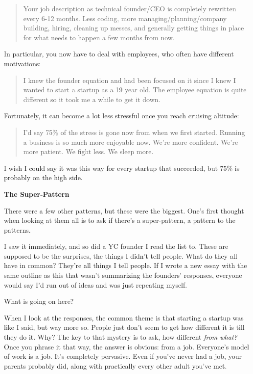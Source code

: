 \documentclass[12pt]{book}
\begin{document}
\begin{quote}
Your job description as technical founder/CEO is completely rewritten
every 6-12 months. Less coding, more managing/planning/company building,
hiring, cleaning up messes, and generally getting things in place for
what needs to happen a few months from now.
\end{quote}

In particular, you now have to deal with employees, who often have
different motivations:

\begin{quote}
I knew the founder equation and had been focused on it since I knew I
wanted to start a startup as a 19 year old. The employee equation is
quite different so it took me a while to get it down.
\end{quote}

Fortunately, it can become a lot less stressful once you reach cruising
altitude:

\begin{quote}
I'd say 75\% of the stress is gone now from when we first started.
Running a business is so much more enjoyable now. We're more confident.
We're more patient. We fight less. We sleep more.
\end{quote}

I wish I could say it was this way for every startup that succeeded, but
75\% is probably on the high side.

\textbf{The Super-Pattern}

There were a few other patterns, but these were the biggest. One's first
thought when looking at them all is to ask if there's a super-pattern, a
pattern to the patterns.

I saw it immediately, and so did a YC founder I read the list to. These
are supposed to be the surprises, the things I didn't tell people. What
do they all have in common? They're all things I tell people. If I wrote
a new essay with the same outline as this that wasn't summarizing the
founders' responses, everyone would say I'd run out of ideas and was
just repeating myself.

What is going on here?

When I look at the responses, the common theme is that starting a
startup was like I said, but way more so. People just don't seem to get
how different it is till they do it. Why? The key to that mystery is to
ask, how different \emph{from what?} Once you phrase it that way, the
answer is obvious: from a job. Everyone's model of work is a job. It's
completely pervasive. Even if you've never had a job, your parents
probably did, along with practically every other adult you've met.
\end{document}
